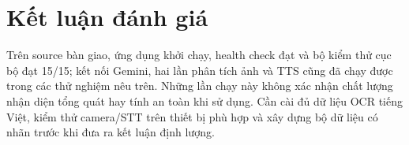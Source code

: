 \section{Kết luận đánh giá}

Trên source bàn giao, ứng dụng khởi chạy, health check đạt và bộ kiểm thử
cục bộ đạt 15/15; kết nối Gemini, hai lần phân tích ảnh và TTS cũng đã chạy
được trong các thử nghiệm nêu trên. Những lần chạy này không xác nhận chất
lượng nhận diện tổng quát hay tính an toàn khi sử dụng. Cần cài đủ dữ liệu
OCR tiếng Việt, kiểm thử camera/STT trên thiết bị phù hợp và xây dựng bộ dữ
liệu có nhãn trước khi đưa ra kết luận định lượng.
